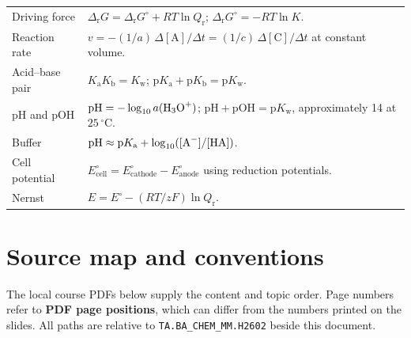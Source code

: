 \documentclass[a4paper,10pt]{article}
\newcommand{\chapterbreak}{\clearpage}
\begin{document}
\begin{longtable}{@{}P{43mm}P{112mm}@{}}
Driving force & $\Delta_{\mathrm r}G=\Delta_{\mathrm r}G^\circ+RT\ln Q_{\mathrm r}$;
$\Delta_{\mathrm r}G^\circ=-RT\ln K$. \\
Reaction rate & $v=-(1/a)\,\Delta[\mathrm A]/\Delta t
=(1/c)\,\Delta[\mathrm C]/\Delta t$ at constant volume. \\
Acid--base pair & $K_{\mathrm a}K_{\mathrm b}=K_{\mathrm w}$;
$\mathrm pK_{\mathrm a}+\mathrm pK_{\mathrm b}=\mathrm pK_{\mathrm w}$. \\
pH and pOH & $\mathrm{pH}=-\log_{10}a(\ce{H3O+})$;
$\mathrm{pH}+\mathrm{pOH}=\mathrm pK_{\mathrm w}$, approximately 14 at
$25\,^{\circ}\mathrm C$. \\
Buffer & $\mathrm{pH}\approx\mathrm pK_{\mathrm a}
+\log_{10}([\ce{A-}]/[\ce{HA}])$. \\
Cell potential & $E^\circ_{\mathrm{cell}}=E^\circ_{\mathrm{cathode}}
-E^\circ_{\mathrm{anode}}$ using reduction potentials. \\
Nernst & $E=E^\circ-(RT/zF)\ln Q_{\mathrm r}$. \\
\end{longtable}

\chapterbreak
\section{Source map and conventions}
\label{app:sources}
The local course PDFs below supply the content and topic order. Page numbers
refer to \textbf{PDF page positions}, which can differ from the numbers printed
on the slides. All paths are relative to
\texttt{TA.BA\_CHEM\_MM.H2602} beside this document.
\end{document}
